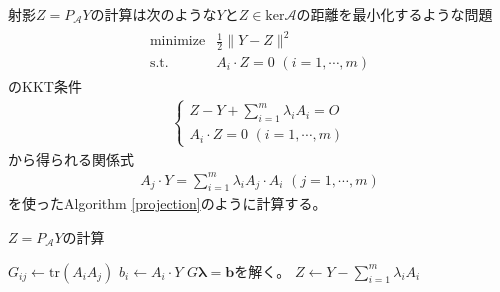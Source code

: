 射影$Z = P_\mathcal{A} Y$の計算は次のような$Y$と$Z \in \mathrm{ker} \mathcal{A}$の距離を最小化するような問題
\begin{align*}
  \begin{array}{ll}
    \text{minimize} & \displaystyle{\frac{1}{2}} \|Y - Z\|^2 \\
    \text{s.t.}     & A_i \cdot Z = 0 \,\, \left(i = 1, \cdots, m\right)
  \end{array}
\end{align*}
のKKT条件
\begin{align*}
  \begin{cases}
    Z - Y + \displaystyle{\sum_{i = 1}^m} \lambda_i A_i = O \\
    A_i \cdot Z = 0 \,\, \left(i = 1, \cdots, m\right)
  \end{cases}
\end{align*}
から得られる関係式
\begin{align*}
  A_j \cdot Y = \displaystyle{\sum_{i = 1}^m} \lambda_i A_j \cdot A_i \,\, \left(j = 1, \cdots, m\right)
\end{align*}
を使ったAlgorithm \ref{projection}のように計算する。
\begin{algorithm}
  \caption{$Z = P_\mathcal{A} Y$の計算}
  \label{projection}
  \begin{algorithmic}[1]
        \State $G_{i j} \leftarrow \mathrm{tr}\left(A_i A_j\right)$
      \EndFor
    \EndFor
      \State $b_i \leftarrow A_i \cdot Y$
    \EndFor
    \State $G {\bm \lambda} = \mathbf{b}$を解く。
    \State \Return $Z \leftarrow Y - \displaystyle{\sum_{i = 1}^m \lambda_i A_i}$
  \end{algorithmic}
\end{algorithm}

